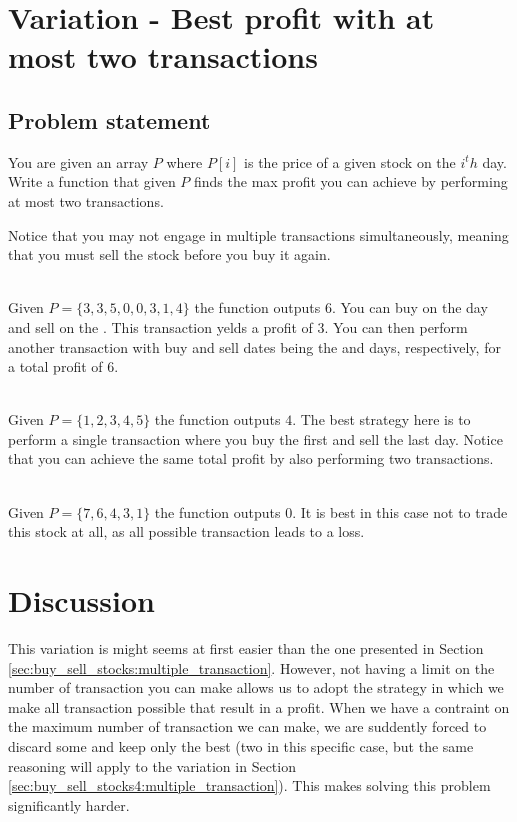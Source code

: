 \section{Variation - Best profit with at most two transactions}
\label{sec:buy_sell_stocks3:intro}

\subsection{Problem statement}
\begin{exercise}
	You are given an array $P$ where $P[i]$ is the price of a given stock on the $i^th$ day.
	Write a function that given $P$ finds the max profit you can achieve by performing at most two transactions.
		
	Notice that you may not engage in multiple transactions simultaneously, meaning that you must sell the stock before you buy it again.
	
	 
	\begin{example}
	\label{ex:buy_sell_stocks_3:exmaple1}
		\hfill \\
		Given $P=\{3,3,5,0,0,3,1,4\}$ the function outputs $6$. 
		You can buy on the  day and sell on the . This transaction yelds a profit of $3$.
		You can then perform another transaction with buy and sell dates being the  and  days, respectively, for a total profit of $6$.
	\end{example}

	\begin{example}
		\label{ex:buy_sell_stocks_3:exmaple2}
			\hfill \\
			Given $P=\{1,2,3,4,5\}$ the function outputs $4$. 
			The best strategy here is to perform a single transaction where you buy the first and sell the last day. Notice that you can achieve the same total profit by also performing two transactions.
	\end{example}

	\begin{example}
		\label{ex:buy_sell_stocks_3:exmaple3}
			\hfill \\
			Given $P=\{7,6,4,3,1\}$ the function outputs $0$. 
			It is best in this case not to trade this stock at all, as all possible transaction leads to a loss.
	\end{example}
\end{exercise}


\section{Discussion}
\label{buy_sell_stocks_3:sec:discussion}
This variation is might seems at first easier than the one presented in Section \ref{sec:buy_sell_stocks:multiple_transaction}. 
However, not having a limit on the number of transaction you can make allows us to adopt the strategy in which we make 
all transaction possible that result in a profit. 
When we have a contraint on the maximum number of transaction we can make, we are suddently forced to discard some and keep only the best (two in this specific case, but the same reasoning will apply to the variation in Section \ref{sec:buy_sell_stocks4:multiple_transaction}).
This makes solving this problem significantly harder.



